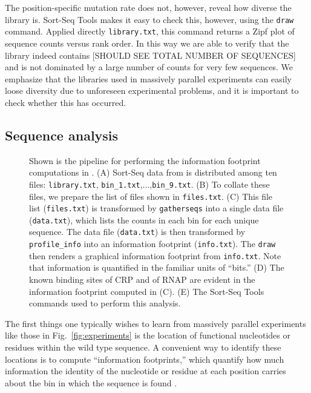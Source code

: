 \documentclass{bmcart}
\newcommand{\fig}[2]{Fig.\ \ref{#1}#2}
\begin{document}
The position-specific mutation rate does not, however, reveal how diverse the library is. Sort-Seq Tools makes it easy to check this, however, using the \texttt{draw} command. Applied directly \texttt{library.txt}, this command returns a Zipf plot of sequence counts versus rank order. In this way we are able to verify that the library indeed contains [SHOULD SEE TOTAL NUMBER OF SEQUENCES] and is not dominated by a large number of counts for very few sequences. We emphasize that the libraries used in massively parallel experiments can easily loose diversity due to unforeseen experimental problems, and it is important to check  whether this has occurred.  

%
%
\subsection*{Sequence analysis}

%
%
\begin{figure}[h!] 
\caption{
 Shown is the pipeline for performing the information footprint computations in \cite{Kinney:2010tn}. 
(A) Sort-Seq data from \cite{Kinney:2010tn} is distributed among ten files: \texttt{library.txt}, \texttt{bin\_1.txt},...,\texttt{bin\_9.txt}. (B) To collate these files, we prepare the list of files shown in \texttt{files.txt}. (C) This file list (\texttt{files.txt}) is transformed by \texttt{gatherseqs} into a single data file (\texttt{data.txt}), which lists the counts in each bin for each unique sequence. The data file (\texttt{data.txt}) is then transformed by \texttt{profile\_info} into an information footprint (\texttt{info.txt}). The \texttt{draw} then renders a graphical information footprint from \texttt{info.txt}. Note that information is quantified in the familiar units of ``bits.'' (D) The known binding sites of CRP and of RNAP are evident in the information footprint computed in (C). (E) The Sort-Seq Tools commands used to perform this analysis. 
}
\label{fig:info}
\end{figure}

The first things one typically wishes to learn from massively parallel experiments like those in \fig{fig:experiments}{} is the location of functional nucleotides or residues within the wild type sequence. A convenient way to identify these locations is to compute ``information footprints,'' which quantify how much information the identity of the nucleotide or residue at each position carries about the bin in which the sequence is found \cite{Kinney:2010tn}. 
\end{document}
